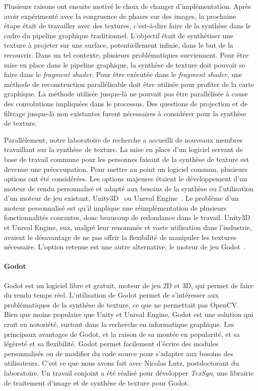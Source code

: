 \bigskip

Plusieurs raisons ont ensuite motivé le choix de changer d'implémentation. Après avoir expérimenté avec la congruence de phases sur des images, la prochaine étape était de travailler avec des textures, c'est-à-dire faire de la synthèse dans le cadre du pipeline graphique traditionnel. L'objectif était de synthétiser une texture à projeter sur une surface, potentiellement infinie, dans le but de la recouvrir. Dans un tel contexte, plusieurs problématiques surviennent. Pour être mise en place dans le pipeline graphique, la synthèse de texture doit pouvoir se faire dans le \textit{fragment shader}. Pour être exécutée dans le \textit{fragment shader}, une méthode de reconstruction parallélisable doit être utilisée pour profiter de la carte graphique. La méthode utilisée jusque-là ne pouvait pas être parallélisée à cause des convolutions impliquées dans le processus. Des questions de projection et de filtrage jusque-là non existantes furent nécessaires à considérer pour la synthèse de texture.

\bigskip

Parallèlement, notre laboratoire de recherche a accueilli de nouveaux membres travaillant sur la synthèse de texture. La mise en place d'un logiciel servant de base de travail commune pour les personnes faisant de la synthèse de texture est devenue une préoccupation. Pour mettre au point un logiciel commun, plusieurs options ont été considérées. Les options majeures étaient le développement d'un moteur de rendu personnalisé et adapté aux besoins de la synthèse ou l'utilisation d'un moteur de jeu existant, Unity3D~\cite{unity_engine} ou Unreal Engine~\cite{unreal_engine}. Le problème d'un moteur personnalisé est qu'il implique une réimplémentation de plusieurs fonctionnalités courantes, donc beaucoup de redondance dans le travail. Unity3D et Unreal Engine, eux, malgré leur renommée et vaste utilisation dans l'industrie, avaient le désavantage de ne pas offrir la flexibilité de manipuler les textures nécessaire. L'option retenue est une autre alternative, le moteur de jeu Godot~\cite{godot_game_engine}.

\paragraph{Godot}

Godot est un logiciel libre et gratuit, moteur de jeu 2D et 3D, qui permet de faire du rendu temps réel. L'utilisation de Godot permet de s'intéresser aux problématiques de la synthèse de texture, ce que ne permettait pas OpenCV. Bien que moins populaire que Unity et Unreal Engine, Godot est une solution qui croit en notoriété, surtout dans la recherche en informatique graphique. Les principaux avantages de Godot, et la raison de sa montée en popularité, et sa légèreté et sa flexibilité. Godot permet facilement d'écrire des modules personnalisés ou de modifier du code source pour s'adapter aux besoins des utilisateurs. C'est ce que nous avons fait avec Nicolas Lutz, postdoctorant du laboratoire. Un travail conjoint a été réalisé pour développer \textit{TexSyn}, une librairie \cpp de traitement d'image et de synthèse de texture pour Godot.

